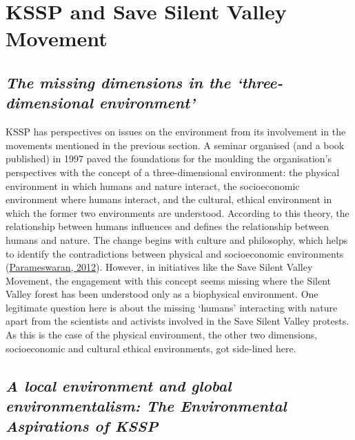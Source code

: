 \documentclass[twoside, 13pt]{article}
\begin{document}
{\vspace{.2cm}

{\fontsize{18}{20}\selectfont\section*{KSSP and Save Silent Valley Movement}}

\vspace{-.2cm}

{\fontsize{8}{10}\selectfont\subsection*{\textit{The missing dimensions in the ‘three-dimensional environment’}}

{\fontsize{12}{14}\selectfont
KSSP has perspectives on issues on the environment from its involvement in the movements mentioned in the previous section. A seminar organised (and a book published) in 1997 paved the foundations for the moulding the organisation’s perspectives with the concept of a three-dimensional environment: the physical environment in which humans and nature interact, the socioeconomic environment where humans interact, and the cultural, ethical environment in which the former two environments are understood. According to this theory, the relationship between humans influences and defines the relationship between humans and nature. The change begins with culture and philosophy, which helps to identify the contradictions between physical and socioeconomic environments (\underline{Parameswaran, 2012}). However, in initiatives like the Save Silent Valley Movement, the engagement with this concept seems missing where the Silent Valley forest has been understood only as a biophysical environment. One legitimate question here is about the missing ‘humans’ interacting with nature apart from the scientists and activists involved in the Save Silent Valley protests. As this is the case of the physical environment, the other two dimensions, socioeconomic and cultural ethical environments, got side-lined here.}

\vspace{-.2cm}

{\fontsize{8}{10}\selectfont\subsection*{\textit{ A local environment and global environmentalism: The Environmental\\ Aspirations of KSSP}}

}}}
\end{document}
